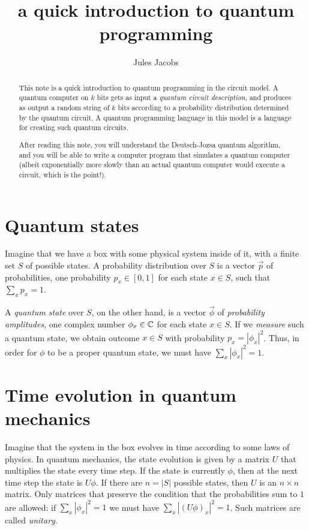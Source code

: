 
\usepackage{braket}
\usetikzlibrary{quantikz}

\title{a quick introduction to quantum programming}

\author{Jules Jacobs}


\maketitle

\begin{abstract}
  This note is a quick introduction to quantum programming in the circuit model.
  A quantum computer on $k$ bits gets as input a \emph{quantum circuit description},
  and produces as output a random string of $k$ bits according to a probability distribution determined by the quantum circuit.
  A quantum programming language in this model is a language for creating such quantum circuits.

  After reading this note, you will understand the Deutsch-Jozsa quantum algorithm,
  and you will be able to write a computer program that simulates a quantum computer
  (albeit exponentially more slowly than an actual quantum computer would execute a circuit, which is the point!).
\end{abstract}

\section{Quantum states}

Imagine that we have a box with some physical system inside of it, with a finite set $S$ of possible states.
A probability distribution over $S$ is a vector $\vec{p}$ of probabilities, one probability $p_x \in [0,1]$ for each state $x \in S$, such that $\sum_x p_x = 1$.

A \emph{quantum state} over $S$, on the other hand, is a vector $\vec{\phi}$ of \emph{probability amplitudes}, one complex number $\phi_x \in \mathbb{C}$ for each state $x \in S$.
If we \emph{measure} such a quantum state, we obtain outcome $x \in S$ with probability $p_x = |\phi_x|^2$.
Thus, in order for $\phi$ to be a proper quantum state, we must have $\sum_x |\phi_x|^2 = 1$.

\section{Time evolution in quantum mechanics}

Imagine that the system in the box evolves in time according to some laws of physics.
In quantum mechanics, the state evolution is given by a matrix $U$ that multiplies the state every time step.
If the state is currently $\phi$, then at the next time step the state is $U\phi$.
If there are $n = |S|$ possible states, then $U$ is an $n \times n$ matrix.
Only matrices that preserve the condition that the probabilities sum to $1$ are allowed: if $\sum_x |\phi_x|^2 = 1$ we must have $\sum_x |(U\phi)_x|^2 = 1$.
Such matrices are called \emph{unitary}.

